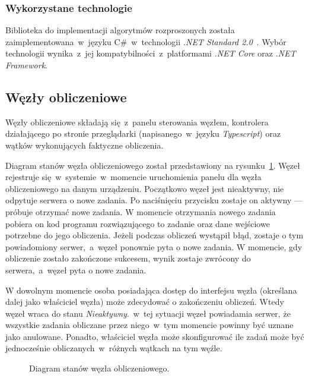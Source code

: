\documentclass[a4paper,11pt,twoside]{report}
\theoremstyle{definition}
\begin{document}
\subsubsection{Wykorzystane technologie}
Biblioteka do implementacji algorytmów rozproszonych została zaimplementowana~w~języku C\#~w~technologii \textit{.NET Standard 2.0}~\cite{dotnet-standard}. Wybór technologii wynika~z~jej kompatybilności~z~platformami \textit{.NET Core} oraz \textit{.NET Framework}.

\subsection{Węzły obliczeniowe}

Węzły obliczeniowe składają się~z~panelu sterowania węzłem, kontrolera działającego po stronie przeglądarki (napisanego~w~języku \textit{Typescript}) oraz wątków wykonujących faktyczne obliczenia.

Diagram stanów węzła obliczeniowego został przedstawiony na rysunku~\ref{node-state}. Węzeł rejestruje się~w~systemie~w~momencie uruchomienia panelu dla węzła obliczeniowego na danym urządzeniu.
Początkowo węzeł jest nieaktywny, nie odpytuje serwera o nowe zadania.
Po naciśnięciu przycisku zostaje on aktywny --- próbuje otrzymać nowe zadania.
W momencie otrzymania nowego zadania pobiera on kod programu rozwiązującego to zadanie oraz dane wejściowe potrzebne do jego obliczenia. Jeżeli podczas obliczeń wystąpił błąd, zostaje o tym powiadomiony serwer,~a~węzeł ponownie pyta o nowe zadania.
W momencie, gdy obliczenie zostało zakończone sukcesem, wynik zostaje zwrócony do serwera,~a~węzeł pyta o nowe zadania.

W dowolnym momencie osoba posiadająca dostęp do interfejsu węzła (określana dalej jako właściciel węzła) może zdecydować o zakończeniu obliczeń. Wtedy węzeł wraca do stanu \textit{Nieaktywny}.~w~tej sytuacji węzeł powiadamia serwer, że wszystkie zadania obliczane przez niego~w~tym momencie powinny być uznane jako anulowane.
Ponadto, właściciel węzła może skonfigurować ile zadań może być jednocześnie obliczanych~w~różnych wątkach na tym węźle.

\begin{figure} 
    \caption{Diagram stanów węzła obliczeniowego.}
    \label{node-state}
\end{figure}
\end{document}
